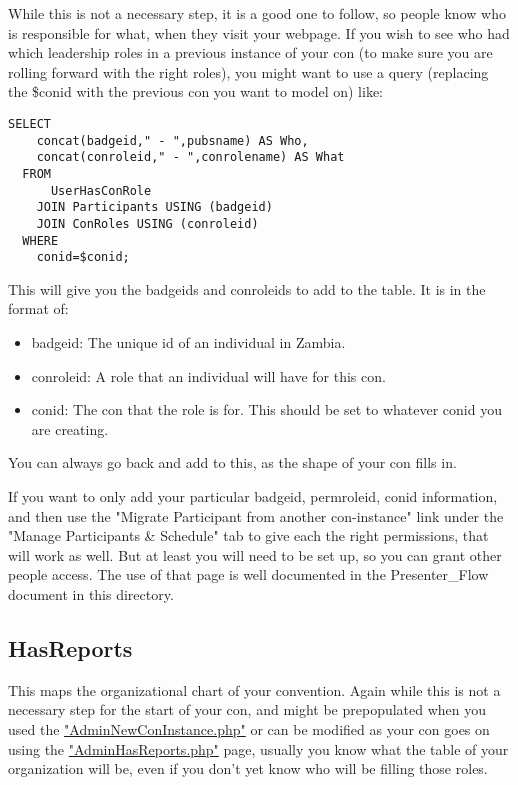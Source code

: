\documentclass[captions=tablesignature]{scrartcl}
\begin{document}
While this is not a necessary step, it is a good one to follow, so
people know who is responsible for what, when they visit your
webpage. If you wish to see who had which leadership roles in a
previous instance of your con (to make sure you are rolling forward
with the right roles), you might want to use a query (replacing the
\$conid with the previous con you want to model on) like:
\begin{verbatim}
SELECT
    concat(badgeid," - ",pubsname) AS Who,
    concat(conroleid," - ",conrolename) AS What
  FROM
      UserHasConRole
    JOIN Participants USING (badgeid)
    JOIN ConRoles USING (conroleid)
  WHERE
    conid=$conid;
\end{verbatim}
This will give you the badgeids and conroleids to add to the
table.  It is in the format of:
\begin{itemize}
\item badgeid: The unique id of an individual in Zambia.
\item conroleid: A role that an individual will have for this con.
\item conid: The con that the role is for.  This should be set to
whatever conid you are creating.
\end{itemize}

You can always go back and add to this, as the shape of your con
fills in.

If you want to only add your particular badgeid, permroleid, conid
information, and then use the "Migrate Participant from another
con-instance" link under the "Manage Participants \& Schedule" tab 
to give each the right permissions, that will work as well.  But at
least you will need to be set up, so you can grant other people
access.  The use of that page is well documented in the
Presenter\_Flow document in this directory.

\subsection{HasReports}
\label{sec-12-3}

This maps the organizational chart of your convention.  Again while
this is not a necessary step for the start of your con, and might
be prepopulated when you used the \href{../webpages/AdminNewConInstance.php}{"AdminNewConInstance.php"} or can
be modified as your con goes on using the \href{../webpages/AdminHasReports.php}{"AdminHasReports.php"}
page, usually you know what the table of your organization will be,
even if you don't yet know who will be filling those roles.
\end{document}
